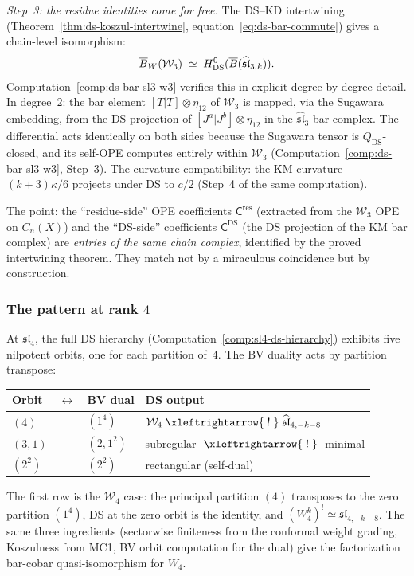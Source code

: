 \emph{Step~3: the residue identities come for free.}
The DS--KD intertwining
(Theorem~\ref{thm:ds-koszul-intertwine},
equation~\eqref{eq:ds-bar-commute}) gives a chain-level
isomorphism:
\[
\overline{B}_W(\mathcal{W}_3) \;\simeq\;
H^0_{\mathrm{DS}}(\overline{B}(\widehat{\mathfrak{sl}}_{3,k})).
\]
Computation~\ref{comp:ds-bar-sl3-w3} verifies this in explicit
degree-by-degree detail.  In degree~$2$: the bar element
$[T|T] \otimes \eta_{12}$ of $\mathcal{W}_3$ is mapped, via the
Sugawara embedding, from the DS projection of $[J^a|J^b] \otimes
\eta_{12}$ in the $\widehat{\mathfrak{sl}}_3$ bar complex.  The
differential acts identically on both sides because the Sugawara
tensor is $Q_{\mathrm{DS}}$-closed, and its self-OPE computes
entirely within $\mathcal{W}_3$
(Computation~\ref{comp:ds-bar-sl3-w3}, Step~3).  The curvature
compatibility: the KM curvature $(k+3)\kappa/6$ projects under DS
to $c/2$ (Step~4 of the same computation).

The point: the ``residue-side'' OPE coefficients
$\mathsf{C}^{\mathrm{res}}$ (extracted from the
$\mathcal{W}_3$ OPE on $\overline{C}_n(X)$) and the
``DS-side'' coefficients $\mathsf{C}^{\mathrm{DS}}$ (the DS
projection of the KM bar complex) are \emph{entries of the same
chain complex}, identified by the proved intertwining theorem.
They match not by a miraculous coincidence but by construction.

\subsubsection*{The pattern at rank $4$}

At $\mathfrak{sl}_4$, the full DS hierarchy
(Computation~\ref{comp:sl4-ds-hierarchy}) exhibits five nilpotent
orbits, one for each partition of~$4$.  The BV duality acts by
partition transpose:
\begin{center}
\renewcommand{\arraystretch}{1.1}
\begin{tabular}{lcl@{\qquad}l}
\textbf{Orbit} & $\longleftrightarrow$ &
\textbf{BV dual} & \textbf{DS output} \\
\hline
$(4)$ & & $(1^4)$ &
$\mathcal{W}_4 \;\xleftrightarrow{\;!\;}\;
\widehat{\mathfrak{sl}}_{4,-k-8}$ \\
$(3,1)$ & & $(2,1^2)$ &
subregular $\;\xleftrightarrow{\;!\;}\;$ minimal \\
$(2^2)$ & & $(2^2)$ &
rectangular (self-dual)
\end{tabular}
\end{center}
The first row is the $\mathcal{W}_4$ case: the principal partition
$(4)$ transposes to the zero partition $(1^4)$, DS at the zero
orbit is the identity, and $(W_4^k)^!
\simeq \widehat{\mathfrak{sl}}_{4,-k-8}$.
The same three ingredients (sectorwise finiteness from the conformal
weight grading, Koszulness from MC1, BV orbit computation for the
dual) give the factorization bar-cobar quasi-isomorphism for $W_4$.


